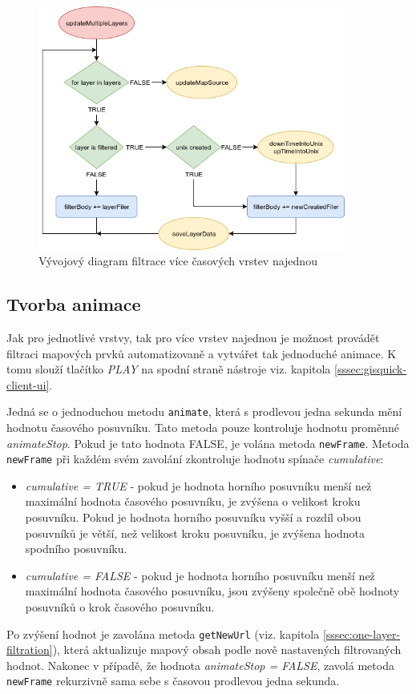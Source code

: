 \begin{figure}[h!]
\centering
\includegraphics[width=0.9\textwidth]{../img/getMultipleLayers.png}
\caption{Vývojový diagram filtrace více časových vrstev najednou \cite{flow-chart}}
\label{fig:multiple-chart}
\end{figure}

\newpage
\subsection{Tvorba animace}
\label{sssec:animation}

Jak pro jednotlivé vrstvy, tak pro více vrstev najednou je možnost
provádět filtraci mapových prvků automatizovaně a vytvářet tak
jednoduché animace. K tomu slouží tlačítko \textit{PLAY} na spodní
straně nástroje viz. kapitola \ref{sssec:gisquick-client-ui}.

Jedná se o jednoduchou metodu \verb|animate|, která s prodlevou jedna
sekunda mění hodnotu časového posuvníku. Tato metoda pouze kontroluje
hodnotu proměnné \textit{animateStop}. Pokud je tato hodnota FALSE, je
volána metoda \verb|newFrame|. Metoda \verb|newFrame| při každém svém
zavolání zkontroluje hodnotu spínače \textit{cumulative}:
\begin{itemize}
\item\textit{cumulative = TRUE} - pokud je hodnota horního posuvníku
menší než maximální hodnota časového posuvníku, je zvýšena o velikost
kroku posuvníku. Pokud je hodnota horního posuvníku vyšší a rozdíl obou
posuvníků je větší, než velikost kroku posuvníku, je zvýšena hodnota
spodního posuvníku.
\item\textit{cumulative = FALSE} - pokud je hodnota horního posuvníku
menší než maximální hodnota časového posuvníku, jsou zvýšeny
společně obě hodnoty posuvníků o krok časového posuvníku.
\end{itemize}
Po zvýšení hodnot je zavolána metoda \verb|getNewUrl| (viz. kapitola
\ref{sssec:one-layer-filtration}), která aktualizuje mapový obsah podle
nově nastavených filtrovaných hodnot. Nakonec v případě, že hodnota
\textit{animateStop = FALSE}, zavolá metoda \verb|newFrame| rekurzivně sama sebe s časovou prodlevou jedna sekunda.

